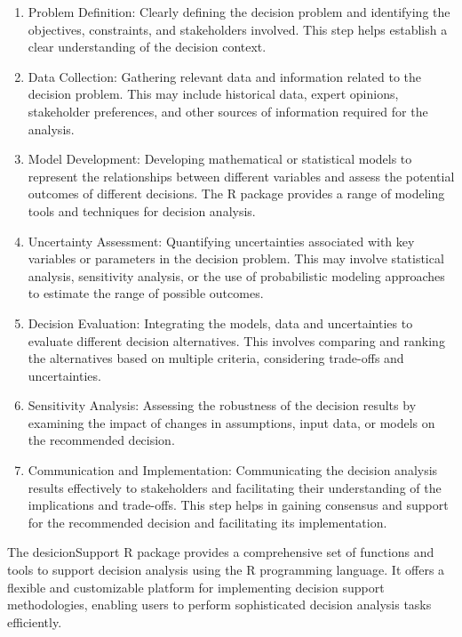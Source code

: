 \documentclass[
]{article}
\begin{document}
\begin{enumerate}
\def\labelenumi{\arabic{enumi}.}
\item
  Problem Definition: Clearly defining the decision problem and
  identifying the objectives, constraints, and stakeholders involved.
  This step helps establish a clear understanding of the decision
  context.
\item
  Data Collection: Gathering relevant data and information related to
  the decision problem. This may include historical data, expert
  opinions, stakeholder preferences, and other sources of information
  required for the analysis.
\item
  Model Development: Developing mathematical or statistical models to
  represent the relationships between different variables and assess the
  potential outcomes of different decisions. The R package provides a
  range of modeling tools and techniques for decision analysis.
\item
  Uncertainty Assessment: Quantifying uncertainties associated with key
  variables or parameters in the decision problem. This may involve
  statistical analysis, sensitivity analysis, or the use of
  probabilistic modeling approaches to estimate the range of possible
  outcomes.
\item
  Decision Evaluation: Integrating the models, data and uncertainties to
  evaluate different decision alternatives. This involves comparing and
  ranking the alternatives based on multiple criteria, considering
  trade-offs and uncertainties.
\item
  Sensitivity Analysis: Assessing the robustness of the decision results
  by examining the impact of changes in assumptions, input data, or
  models on the recommended decision.
\item
  Communication and Implementation: Communicating the decision analysis
  results effectively to stakeholders and facilitating their
  understanding of the implications and trade-offs. This step helps in
  gaining consensus and support for the recommended decision and
  facilitating its implementation.
\end{enumerate}

The desicionSupport R package provides a comprehensive set of functions
and tools to support decision analysis using the R programming language.
It offers a flexible and customizable platform for implementing decision
support methodologies, enabling users to perform sophisticated decision
analysis tasks efficiently.
\end{document}
